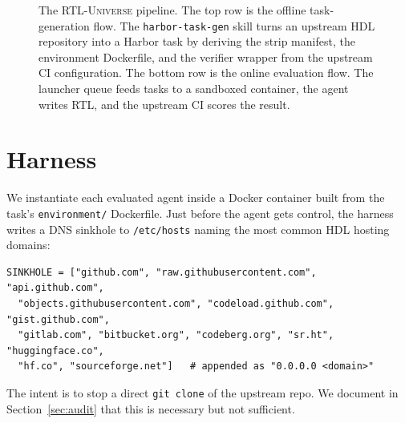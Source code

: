 \documentclass{article}
\begin{document}
\begin{figure}[H]
{%
}
\caption{The \textsc{RTL-Universe} pipeline. The top row is the offline task-generation
flow. The \texttt{harbor-task-gen} skill turns an upstream HDL repository into a Harbor task
by deriving the strip manifest, the environment Dockerfile, and the verifier wrapper from
the upstream CI configuration. The bottom row is the online evaluation flow. The launcher
queue feeds tasks to a sandboxed container, the agent writes RTL, and the upstream CI scores
the result.}
\label{fig:pipeline}
\end{figure}

\section{Harness}
\label{sec:harness}

We instantiate each evaluated agent inside a Docker container built from the task's
\texttt{environment/} Dockerfile. Just before the agent gets control, the harness writes a
DNS sinkhole to \texttt{/etc/hosts} naming the most common HDL hosting domains:
\begin{lstlisting}
SINKHOLE = ["github.com", "raw.githubusercontent.com", "api.github.com",
  "objects.githubusercontent.com", "codeload.github.com", "gist.github.com",
  "gitlab.com", "bitbucket.org", "codeberg.org", "sr.ht", "huggingface.co",
  "hf.co", "sourceforge.net"]   # appended as "0.0.0.0 <domain>"
\end{lstlisting}
The intent is to stop a direct \texttt{git clone} of the upstream repo. We document in
Section~\ref{sec:audit} that this is necessary but not sufficient.
\end{document}
